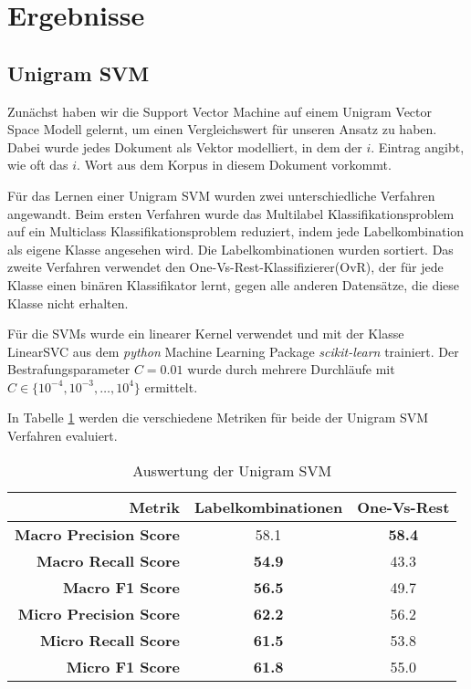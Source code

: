 \section{Ergebnisse}

\subsection{Unigram SVM}
\label{sub:unigram_svm}

Zunächst haben wir die Support Vector Machine auf einem Unigram Vector Space Modell gelernt,
um einen Vergleichswert für unseren Ansatz zu haben.
Dabei wurde jedes Dokument als Vektor modelliert, in dem der $i$. Eintrag angibt, wie oft das $i$. Wort aus dem Korpus in diesem Dokument vorkommt.

Für das Lernen einer Unigram SVM wurden zwei unterschiedliche Verfahren angewandt.
Beim ersten Verfahren wurde das Multilabel Klassifikationsproblem auf ein Multiclass Klassifikationsproblem reduziert,
indem jede Labelkombination als eigene Klasse angesehen wird.
Die Labelkombinationen wurden sortiert.
Das zweite Verfahren verwendet den One-Vs-Rest-Klassifizierer(OvR), der für jede Klasse einen binären Klassifikator lernt,
gegen alle anderen Datensätze, die diese Klasse nicht erhalten.

Für die SVMs wurde ein linearer Kernel verwendet und mit der Klasse LinearSVC aus dem \emph{python} Machine Learning Package \emph{scikit-learn} \cite{scikit-learn} trainiert.
Der Bestrafungsparameter $C = 0.01$ wurde durch mehrere Durchläufe mit $C \in \{ 10^{-4},10^{-3}, \dots, 10^4 \}$ ermittelt.

In Tabelle \ref{tab:unigram_svm} werden die verschiedene Metriken für beide der Unigram SVM Verfahren evaluiert.

\begin{table}[h]
    \centering
    \begin{tabular}{r|cc}
        \small \textbf{Metrik} & \small\textbf{Labelkombinationen} & \small\textbf{One-Vs-Rest}\\
        \hline
        \small \textbf{Macro Precision Score}  & \small 58.1 & \small  \textbf{58.4}\\
        \small \textbf{Macro Recall Score}     & \small \textbf{54.9} & \small 43.3\\
        \small \textbf{Macro F1 Score}        & \small \textbf{56.5} & \small 49.7\\
        \small \textbf{Micro Precision Score} & \small \textbf{62.2} & \small 56.2\\
        \small \textbf{Micro Recall Score}    & \small \textbf{61.5} & \small 53.8\\
        \small \textbf{Micro F1 Score}        & \small \textbf{61.8} & \small 55.0\\
    \end{tabular}
    \caption{Auswertung der Unigram SVM}
    \label{tab:unigram_svm}
\end{table}

